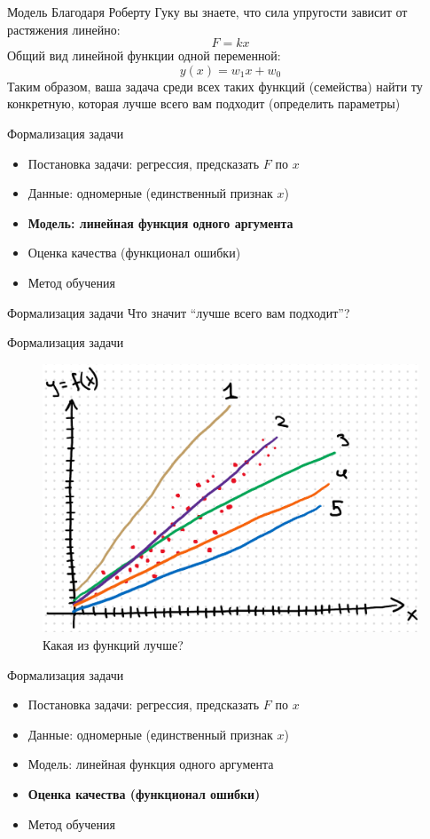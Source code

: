 \documentclass[aspectratio=169]{beamer}
\begin{document}
\begin{frame}{Модель}
    Благодаря Роберту Гуку вы знаете, что сила упругости зависит от растяжения линейно:
    {\LARGE \[ F = k x \]}
    \pause{}
    Общий вид линейной функции одной переменной:
    {\LARGE \[ y(x) = w_1 x + w_0 \]}
    \pause{}
    Таким образом, ваша задача среди всех таких функций (семейства) найти ту конкретную,
    которая лучше всего вам подходит (определить параметры)
\end{frame}

\begin{frame}{Формализация задачи}
    \begin{itemize}
        \item Постановка задачи: регрессия, предсказать \( F \) по \( x \)
        \item Данные: одномерные (единственный признак \( x \))
        \item \textbf{Модель: линейная функция одного аргумента}
        \item Оценка качества (функционал ошибки)
        \item Метод обучения
    \end{itemize}
\end{frame}

\begin{frame}{Формализация задачи}
    \centering
    {\Large Что значит ``лучше всего вам подходит''?}
\end{frame}

\begin{frame}{Формализация задачи}
    \begin{figure}
        \centering
        \includegraphics[width=.54\linewidth]{graphs/fig4.png}
        \caption*{Какая из функций лучше?}
    \end{figure}
\end{frame}

\begin{frame}{Формализация задачи}
    \begin{itemize}
        \item Постановка задачи: регрессия, предсказать \( F \) по \( x \)
        \item Данные: одномерные (единственный признак \( x \))
        \item Модель: линейная функция одного аргумента
        \item \textbf{Оценка качества (функционал ошибки)}
        \item Метод обучения
    \end{itemize}
\end{frame}
\end{document}
